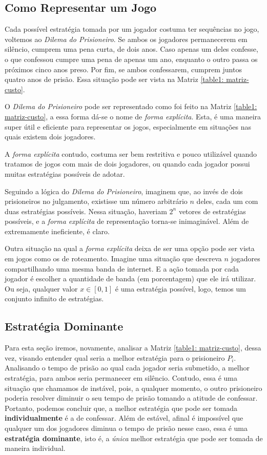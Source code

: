 \documentclass[twoside,conference,a4paper]{IEEEtran}
\begin{document}
        \subsection{Como Representar um Jogo}
            Cada possível estratégia tomada por um jogador costuma ter sequências no jogo, voltemos ao \emph{Dilema do Prisioneiro}. Se ambos os jogadores permanecerem em silêncio, cumprem uma pena curta, de dois anos. Caso apenas um deles confesse, o que confessou cumpre uma pena de apenas um ano, enquanto o outro passa os próximos cinco anos preso. Por fim, se ambos confessarem, cumprem juntos quatro anos de prisão. Essa situação pode ser vista na Matriz \ref{table1: matriz-custo}.
            
            O \emph{Dilema do Prisioneiro} pode ser representado como foi feito na Matriz \ref{table1: matriz-custo}, a essa forma dá-se o nome de \emph{forma explícita}. Esta, é uma maneira super útil e eficiente para representar os jogos, especialmente em situações nas quais existem dois jogadores.
            
            A \emph{forma explícita} contudo, costuma ser bem restritiva e pouco utilizável quando tratamos de jogos com mais de dois jogadores, ou quando cada jogador possui muitas estratégias possíveis de adotar. 
            
            Seguindo a lógica do \emph{Dilema do Prisioneiro}, imaginem que, ao invés de dois prisioneiros no julgamento, existisse um número arbitrário $n$ deles, cada um com duas estratégias possíveis. Nessa situação, haveriam $2^n$ vetores de estratégias possíveis, e a \emph{forma explícita} de representação torna-se inimaginável. Além de extremamente ineficiente, é claro.
            
            Outra situação na qual a \emph{forma explícita} deixa de ser uma opção pode ser vista em jogos como os de roteamento. Imagine uma situação que descreva $n$ jogadores compartilhando uma mesma banda de internet. E a ação tomada por cada jogador é escolher a quantidade de banda (em porcentagem) que ele irá utilizar. Ou seja, qualquer valor $x \in [0,1]$ é uma estratégia possível, logo, temos um conjunto infinito de estratégias.
        
        \subsection{Estratégia Dominante}
            Para esta seção iremos, novamente, analisar a Matriz \ref{table1: matriz-custo}, dessa vez, visando entender qual seria a melhor estratégia para o prisioneiro $P_i$. Analisando o tempo de prisão ao qual cada jogador seria submetido, a melhor estratégia, para ambos seria permanecer em silêncio. Contudo, essa é uma situação que chamamos de instável, pois, a qualquer momento, o outro prisioneiro poderia resolver diminuir o seu tempo de prisão tomando a atitude de confessar. Portanto, podemos concluir que, a melhor estratégia que pode ser tomada \textbf{individualmente} é a de confessar. Além de estável, afinal é impossível que qualquer um dos jogadores diminua o tempo de prisão nesse caso, essa é uma \textbf{estratégia dominante}, isto é, a \emph{única} melhor estratégia que pode ser tomada de maneira individual.
            
\end{document}
